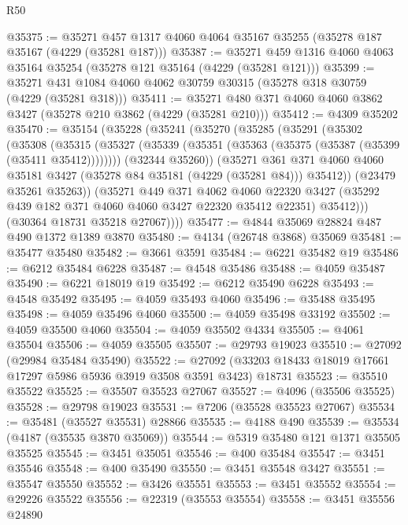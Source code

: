 \begin{lexlean}{R50}
\begin{coremodule}
@35375 := @35271 @457 @1317 @4060 @4064 @35167 @35255 (@35278 @187 @35167 (@4229 (@35281 @187)))
@35387 := @35271 @459 @1316 @4060 @4063 @35164 @35254 (@35278 @121 @35164 (@4229 (@35281 @121)))
@35399 := @35271 @431 @1084 @4060 @4062 @30759 @30315 (@35278 @318 @30759 (@4229 (@35281 @318)))
@35411 := @35271 @480 @371 @4060 @4060 @3862 @3427 (@35278 @210 @3862 (@4229 (@35281 @210)))
@35412 := @4309 @35202
@35470 := @35154
    (@35228
      (@35241
        (@35270
          (@35285
            (@35291
              (@35302
                (@35308
                  (@35315
                    (@35327 (@35339 (@35351 (@35363 (@35375 (@35387 (@35399 (@35411 @35412))))))))
                    (@32344 @35260))
                  (@35271
                    @361
                    @371
                    @4060
                    @4060
                    @35181
                    @3427
                    (@35278 @84 @35181 (@4229 (@35281 @84)))
                    @35412))
                (@23479 @35261 @35263))
              (@35271
                @449
                @371
                @4062
                @4060
                @22320
                @3427
                (@35292 @439 @182 @371 @4060 @4060 @3427 @22320 @35412 @22351)
                @35412)))
          (@30364 @18731 @35218 @27067))))
@35477 := @4844 @35069 @28824 @487 @490 @1372 @1389 @3870
@35480 := @4134 (@26748 @3868) @35069
@35481 := @35477 @35480
@35482 := @3661 @3591
@35484 := @6221 @35482 @19
@35486 := @6212 @35484 @6228
@35487 := @4548 @35486
@35488 := @4059 @35487
@35490 := @6221 @18019 @19
@35492 := @6212 @35490 @6228
@35493 := @4548 @35492
@35495 := @4059 @35493 @4060
@35496 := @35488 @35495
@35498 := @4059 @35496 @4060
@35500 := @4059 @35498 @33192
@35502 := @4059 @35500 @4060
@35504 := @4059 @35502 @4334
@35505 := @4061 @35504
@35506 := @4059 @35505
@35507 := @29793 @19023
@35510 := @27092 (@29984 @35484 @35490)
@35522 := @27092 (@33203 @18433 @18019 @17661 @17297 @5986 @5936 @3919 @3508 @3591 @3423) @18731
@35523 := @35510 @35522
@35525 := @35507 @35523 @27067
@35527 := @4096 (@35506 @35525)
@35528 := @29798 @19023
@35531 := @7206 (@35528 @35523 @27067)
@35534 := @35481 (@35527 @35531) @28866
@35535 := @4188 @490
@35539 := @35534 (@4187 (@35535 @3870 @35069))
@35544 := @5319 @35480 @121 @1371 @35505 @35525
@35545 := @3451 @35051
@35546 := @400 @35484
@35547 := @3451 @35546
@35548 := @400 @35490
@35550 := @3451 @35548 @3427
@35551 := @35547 @35550
@35552 := @3426 @35551
@35553 := @3451 @35552
@35554 := @29226 @35522
@35556 := @22319 (@35553 @35554)
@35558 := @3451 @35556 @24890

\end{coremodule}
\end{lexlean}
